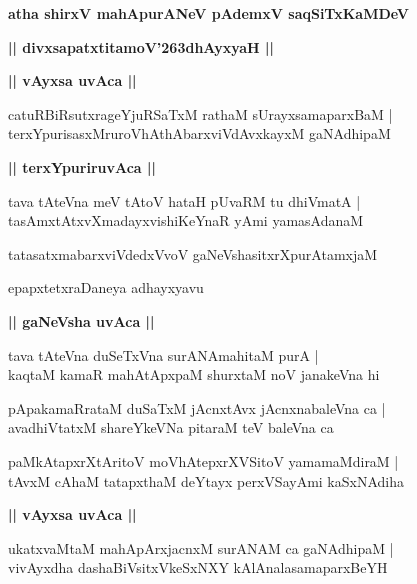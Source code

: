\documentclass[twoside,12pt,openright]{book}
\def\S{\char'263}
\newcounter{shloka}[chapter]
\def\uvaca#1{\centerline{{\large\textbf{#1}}}}
\begin{document}
\begin{center}
{\LARGE\bfseries atha shirxV mahApurANeV pAdemxV saqSiTxKaMDeV}
\end{center}

\begin{center}
{\LARGE\bfseries || divxsapatxtitamoV\S dhAyxyaH || }
\end{center}

\uvaca{|| vAyxsa uvAca ||}

\begin{shloka}%
catuRBiRsutxrageYjuRSaTxM rathaM sUrayxsamaparxBaM |\\
terxYpurisasxMruroVhAthAbarxviVdAvxkayxM gaNAdhipaM 
\end{shloka}

\uvaca{|| terxYpuriruvAca ||}

\begin{shloka}%
tava tAteVna meV tAtoV hataH pUvaRM tu dhiVmatA |\\
tasAmxtAtxvXmadayxvishiKeYnaR yAmi yamasAdanaM 
\end{shloka}

\begin{shloka}%
tatasatxmabarxviVdedxVvoV gaNeVshasitxrXpurAtamxjaM 
\end{shloka}

\begin{center}
epapxtetxraDaneya adhayxyavu 
\end{center}

\uvaca{|| gaNeVsha uvAca ||}

\begin{shloka}%
tava tAteVna duSeTxVna surANAmahitaM purA |\\
kaqtaM kamaR mahAtApxpaM shurxtaM noV janakeVna hi 
\end{shloka}

\begin{shloka}%
pApakamaRrataM duSaTxM jAcnxtAvx jAcnxnabaleVna ca |\\
avadhiVtatxM shareYkeVNa pitaraM teV baleVna ca 
\end{shloka}

\begin{shloka}%
paMkAtapxrXtAritoV moVhAtepxrXVSitoV yamamaMdiraM |\\
tAvxM cAhaM tatapxthaM deYtayx perxVSayAmi kaSxNAdiha 
\end{shloka}

\uvaca{|| vAyxsa uvAca ||}

\begin{shloka}%
ukatxvaMtaM mahApArxjacnxM surANAM ca gaNAdhipaM |\\
vivAyxdha dashaBiVsitxVkeSxNXY kAlAnalasamaparxBeYH 
\end{shloka}
\end{document}

